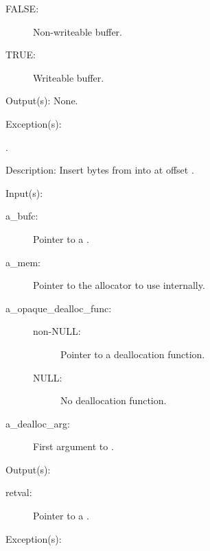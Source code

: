 \begin{capi}
\begin{capilist}
\begin{description}
\begin{description}
			\item[FALSE: ]
				Non-writeable buffer.
			\item[TRUE: ]
				Writeable buffer.
			\end{description}
		\end{description}
	\item[Output(s): ] None.
	\item[Exception(s): ]
		\begin{description}\item[]
		\item[.]
		\end{description}
	\item[Description: ]
		Insert  bytes from  into
		 at offset .
	\end{capilist}
\label{bufc_new}
	\begin{capilist}
	\item[Input(s): ]
		\begin{description}\item[]
		\item[a\_bufc: ]
			Pointer to a .
		\item[a\_mem: ]
			Pointer to the allocator to use internally.
		\item[a\_opaque\_dealloc\_func: ]
			\begin{description}\item[]
			\item[non-NULL: ] Pointer to a deallocation function.
			\item[NULL: ] No deallocation function.
			\end{description}
		\item[a\_dealloc\_arg: ]
			First argument to .
		\end{description}
	\item[Output(s): ]
		\begin{description}\item[]
		\item[retval: ]
			Pointer to a .
		\end{description}
	\item[Exception(s): ]
		\begin{description}\item[]

\end{description}
\end{capilist}
\end{capi}
